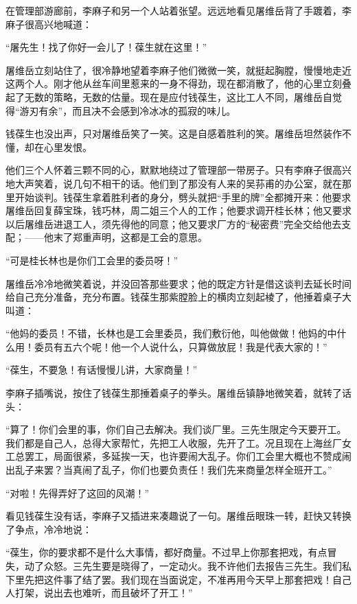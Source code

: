 \par 在管理部游廊前，李麻子和另一个人站着张望。远远地看见屠维岳背了手踱着，李麻子很高兴地喊道：
\par “屠先生！找了你好一会儿了！葆生就在这里！”
\par 屠维岳立刻站住了，很冷静地望着李麻子他们微微一笑，就挺起胸膛，慢慢地走近这两个人。刚才他从丝车间里惹来的一身不得劲，现在都消散了，他的心里立刻叠起了无数的策略，无数的估量。现在是应付钱葆生，这比工人不同，屠维岳自觉得“游刃有余”，而且决不会感到冷冰冰的孤寂的味儿。
\par 钱葆生也没出声，只对屠维岳笑了一笑。这是自感着胜利的笑。屠维岳坦然装作不懂，却在心里发恨。
\par 他们三个人怀着三颗不同的心，默默地绕过了管理部一带房子。只有李麻子很高兴地大声笑着，说几句不相干的话。他们到了那没有人来的吴荪甫的办公室，就在那里开始谈判。钱葆生拿着胜利者的身分，劈头就把“手里的牌”全都摊开来：他要求屠维岳回复薛宝珠，钱巧林，周二姐三个人的工作；他要求调开桂长林；他又要求以后屠维岳进退工人，须先得他的同意；他又要求厂方的“秘密费”完全交给他去支配；——他末了郑重声明，这都是工会的意思。
\par “可是桂长林也是你们工会里的委员呀！”
\par 屠维岳冷冷地微笑着说，并没回答那些要求；他的既定方针是借这谈判去延长时间给自己充分准备，充分布置。钱葆生那紫膛脸上的横肉立刻起棱了，他捶着桌子大叫道：
\par “他妈的委员！不错，长林也是工会里委员，我们敷衍他，叫他做做！他妈的中什么用！委员有五六个呢！他一个人说什么，只算做放屁！我是代表大家的！”
\par “葆生，不要急！有话慢慢儿讲，大家商量！”
\par 李麻子插嘴说，按住了钱葆生那捶着桌子的拳头。屠维岳镇静地微笑着，就转了话头：
\par “算了！你们会里的事，你们自己去解决。我们谈厂里。三先生限定今天要开工。我们都是自己人，总得大家帮忙，先把工人收服，先开了工。况且现在上海丝厂女工总罢工，局面很紧，多延挨一天，也许要闹大乱子。你们工会里大概也不赞成闹出乱子来罢？当真闹了乱子，你们也要负责任！我们先来商量怎样全班开工。”
\par “对啦！先得弄好了这回的风潮！”
\par 看见钱葆生没有话，李麻子又插进来凑趣说了一句。屠维岳眼珠一转，赶快又转换了争点，冷冷地说：
\par “葆生，你的要求都不是什么大事情，都好商量。不过早上你那套把戏，有点冒失，动了众怒。三先生要是晓得了，一定动火。我不许他们去报告三先生。我们私下里先把这件事了结了罢。我们现在当面说定，不准再用今天早上那套把戏！自己人打架，说出去也难听，而且破坏了开工！”

